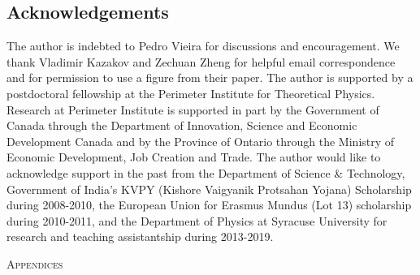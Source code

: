 \documentclass[11pt]{article}
\begin{document}

\vspace{8mm}

\subsection*{Acknowledgements}
The author is indebted to Pedro Vieira
for discussions and encouragement. We thank Vladimir Kazakov 
and Zechuan Zheng for helpful email correspondence and for 
permission to use a figure from their paper. The author is supported by a 
postdoctoral fellowship at the Perimeter Institute for Theoretical Physics. Research at Perimeter 
Institute is supported in part by the Government of Canada through the Department of Innovation, 
Science and Economic Development Canada and by the Province of Ontario through 
the Ministry of Economic Development, Job Creation and Trade.
The author would like to acknowledge support in the past from 
the Department of Science \& Technology, Government of India's KVPY
(Kishore Vaigyanik Protsahan Yojana) Scholarship during 2008-2010, 
the European Union for Erasmus Mundus (Lot 13) scholarship during 2010-2011, 
and the Department of Physics at Syracuse University for research and teaching
assistantship during 2013-2019. 



\vspace{16mm}
\appendix
\begin{center} \large{\textsc{Appendices}}\end{center}
\end{document}
